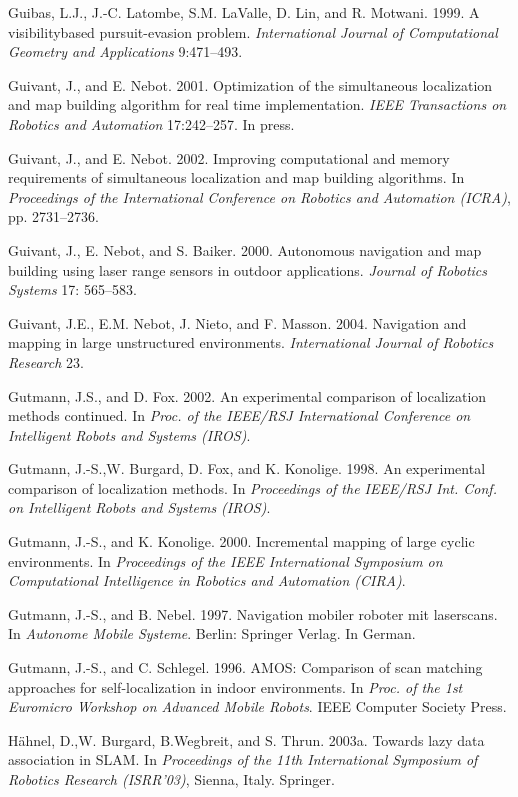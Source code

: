 \documentclass[10pt,a4paper]{article}
\begin{document}
Guibas, L.J., J.-C. Latombe, S.M. LaValle, D. Lin, and R. Motwani. 1999. A visibilitybased
pursuit-evasion problem. \textit{International Journal of Computational Geometry and
Applications} 9:471–493.

Guivant, J., and E. Nebot. 2001. Optimization of the simultaneous localization and
map building algorithm for real time implementation. \textit{IEEE Transactions on Robotics
and Automation} 17:242–257. In press.

Guivant, J., and E. Nebot. 2002. Improving computational and memory requirements
of simultaneous localization and map building algorithms. In \textit{Proceedings of the
International Conference on Robotics and Automation (ICRA)}, pp. 2731–2736.

Guivant, J., E. Nebot, and S. Baiker. 2000. Autonomous navigation and map building
using laser range sensors in outdoor applications. \textit{Journal of Robotics Systems} 17:
565–583.

Guivant, J.E., E.M. Nebot, J. Nieto, and F. Masson. 2004. Navigation and mapping in
large unstructured environments. \textit{International Journal of Robotics Research} 23.

Gutmann, J.S., and D. Fox. 2002. An experimental comparison of localization methods
continued. In \textit{Proc. of the IEEE/RSJ International Conference on Intelligent Robots
and Systems (IROS)}.

Gutmann, J.-S.,W. Burgard, D. Fox, and K. Konolige. 1998. An experimental comparison
of localization methods. In \textit{Proceedings of the IEEE/RSJ Int. Conf. on Intelligent
Robots and Systems (IROS)}.

Gutmann, J.-S., and K. Konolige. 2000. Incremental mapping of large cyclic environments.
In \textit{Proceedings of the IEEE International Symposium on Computational Intelligence
in Robotics and Automation (CIRA)}.

Gutmann, J.-S., and B. Nebel. 1997. Navigation mobiler roboter mit laserscans. In
\textit{Autonome Mobile Systeme}. Berlin: Springer Verlag. In German.

Gutmann, J.-S., and C. Schlegel. 1996. AMOS: Comparison of scan matching approaches
for self-localization in indoor environments. In \textit{Proc. of the 1st Euromicro
Workshop on Advanced Mobile Robots}. IEEE Computer Society Press.

Hähnel, D.,W. Burgard, B.Wegbreit, and S. Thrun. 2003a. Towards lazy data association
in SLAM. In \textit{Proceedings of the 11th International Symposium of Robotics Research
(ISRR’03)}, Sienna, Italy. Springer.
\end{document}
